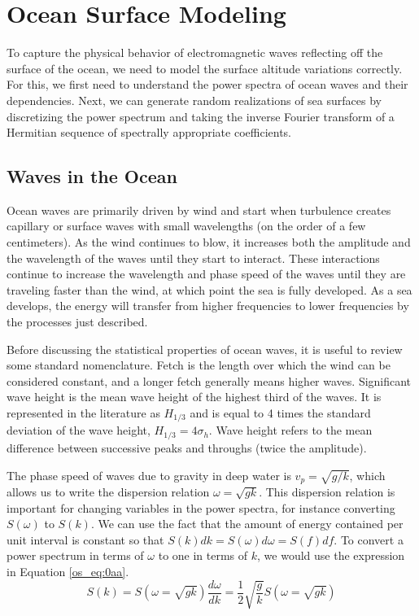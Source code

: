 \chapter{Ocean Surface Modeling}
To capture the physical behavior of electromagnetic waves reflecting off the surface of the ocean, we need to model the surface altitude variations correctly. For this, we first need to understand the power spectra of ocean waves and their dependencies. Next, we can generate random realizations of sea surfaces by discretizing the power spectrum and taking the inverse Fourier transform of a Hermitian sequence of spectrally appropriate coefficients.

\section {Waves in the Ocean}
Ocean waves are primarily driven by wind and start when turbulence creates capillary or surface waves with small wavelengths (on the order of a few centimeters). As the wind continues to blow, it increases both the amplitude and the wavelength of the waves until they start to interact. These interactions continue to increase the wavelength and phase speed of the waves until they are traveling faster than the wind, at which point the sea is fully developed. As a sea develops, the energy will transfer from higher frequencies to lower frequencies by the processes just described.

Before discussing the statistical properties of ocean waves, it is useful to review some standard nomenclature. Fetch is the length over which the wind can be considered constant, and a longer fetch generally means higher waves. Significant wave height is the mean wave height of the highest third of the waves. It is represented in the literature as $H_{1/3}$ and is equal to 4 times the standard deviation of the wave height, $H_{1/3} = 4\sigma_h$. Wave height refers to the mean difference between successive peaks and throughs (twice the amplitude).

The phase speed of waves due to gravity in deep water is $v_p=\sqrt{g/k}$, which allows us to write the dispersion relation $\omega = \sqrt{gk}$. This dispersion relation is important for changing variables in the power spectra, for instance converting $S(\omega)$ to $S(k)$. We can use the fact that the amount of energy contained per unit interval is constant so that $S(k)dk = S(\omega)d\omega = S(f)df$. To convert a power spectrum in terms of $\omega$ to one in terms of $k$, we would use the expression in Equation \ref{os_eq:0aa}.
\begin{equation}
  \label{os_eq:0aa}
  S(k) = S(\omega = \sqrt{gk})\frac{d\omega}{dk} = \frac{1}{2}\sqrt{\frac{g}{k}}S(\omega=\sqrt{gk})
  \end{equation}

